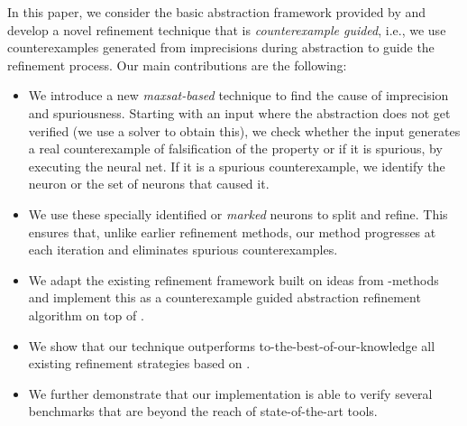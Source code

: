
In this paper, we consider the basic abstraction framework provided by \deeppoly{} and develop a novel refinement technique that is {\em counterexample guided}, i.e., we use counterexamples generated from imprecisions during abstraction to guide the refinement process. Our main contributions are the following:
\begin{itemize}
\item We introduce a new {\em maxsat-based} technique to find the cause of imprecision and spuriousness. Starting with an input where the abstraction does not get verified (we use a \milp{} solver to obtain this), we check whether the input generates a real counterexample of falsification of the property or if it is spurious, by executing the neural net. If it is a spurious counterexample, we identify the neuron or the set of neurons that caused it.  
\item We use these specially identified or {\em marked} neurons to split and refine. This ensures that, unlike earlier refinement methods, our method progresses at each iteration and eliminates spurious counterexamples.
\item We adapt the existing refinement framework built on ideas from \milp{}-methods and implement this as a counterexample guided abstraction refinement algorithm on top of \deeppoly{}.
\item We show that our technique outperforms to-the-best-of-our-knowledge all existing refinement strategies based on \deeppoly{}.
\item We further demonstrate that our implementation is able to verify several benchmarks that are beyond the reach of state-of-the-art tools.%
\end{itemize}

